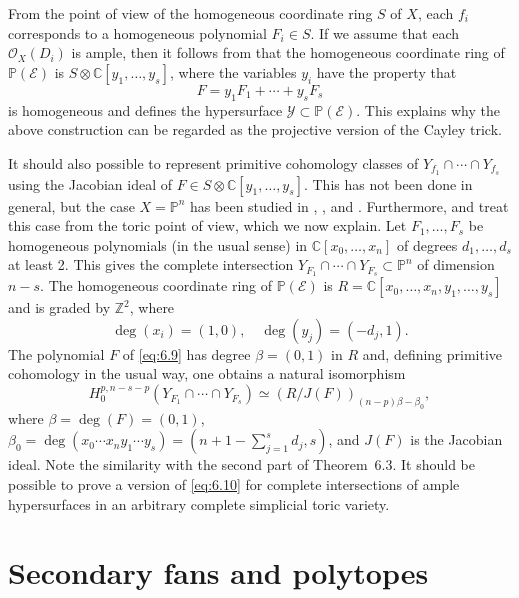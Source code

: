 \documentclass{amsart}
\theoremstyle{plain}
\theoremstyle{definition}
\begin{document}
	From the point of view of the homogeneous coordinate ring $S$
of $X$, each $f_i$ corresponds to a homogeneous polynomial $F_i \in
S$.  If we assume that each $\mathcal{O}_X(D_i)$ is ample, then it follows
from \cite{CCD} that the homogeneous coordinate ring of $\mathbb{P}(\mathcal{E})$ is $S\otimes\mathbb{C}[y_1,\dots,y_s]$, where the variables
$y_i$ have the property that
\begin{equation}
F = y_1 F_1 + \cdots + y_s F_s
\tag{6.9}\label{eq:6.9}
\end{equation}
is homogeneous and defines the hypersurface $\mathcal{Y} \subset \mathbb{P}(\mathcal{E})$.  This explains why the above construction can be
regarded as the projective version of the Cayley trick.

	It should also possible to represent primitive cohomology
classes of $Y_{f_1} \cap\cdots\cap Y_{f_s}$ using the Jacobian ideal
of $F \in S\otimes\mathbb{C}[y_1,\dots,y_s]$.  This has not been done in
general, but the case $X = \mathbb{P}^n$ has been studied in \cite{ENV},
\cite{Konn}, \cite{LT} and \cite{Ter}.  Furthermore, \cite{Dim} and
\cite{Nag} treat this case from the toric point of view, which we now
explain.  Let $F_1,\dots,F_s$ be homogeneous polynomials (in the usual
sense) in $\mathbb{C}[x_0,\dots,x_n]$ of degrees $d_1,\dots,d_s$ at
least 2.  This gives the complete intersection $Y_{F_1}
\cap\cdots\cap Y_{F_s} \subset \mathbb{P}^n$ of dimension $n-s$.  The
homogeneous coordinate ring of $\mathbb{P}(\mathcal{E})$ is $R = \mathbb{C}[x_0,\dots,x_n,y_1,\dots,y_s]$ and is graded by $\mathbb{Z}^2$, where
\[
\deg(x_i) = (1,0),\quad \deg(y_j) = (-d_j,1).
\]
The polynomial $F$ of \eqref{eq:6.9} has degree $\beta = (0,1)$ in $R$
and, defining primitive cohomology in the usual way, one obtains a
natural isomorphism
\begin{equation}
H_0^{p,n-s-p}(Y_{F_1} \cap\cdots\cap Y_{F_s}) \simeq
(R/J(F))_{(n-p)\beta - \beta_0},
\tag{6.10}\label{eq:6.10}
\end{equation}
where $\beta = \deg(F) = (0,1)$, $\beta_0 = \deg(x_0\cdots
x_ny_1\cdots y_s) = (n+1-\sum_{j=1}^s d_j,s)$, and $J(F)$ is the
Jacobian ideal.  Note the similarity with the second part of
Theorem~6.3.  It should be possible to prove a version of
\eqref{eq:6.10} for complete intersections of ample hypersurfaces in an 
arbitrary complete simplicial toric variety.

\section{Secondary fans and polytopes}
\end{document}
